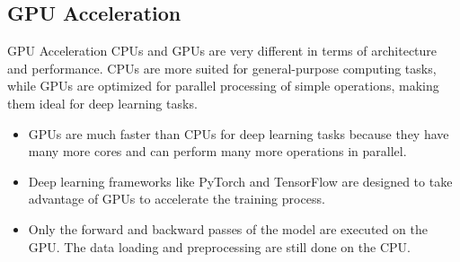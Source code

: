 \subsection{GPU Acceleration}
\begin{frame}{}{GPU Acceleration}
    CPUs and GPUs are very different in terms of architecture and performance. CPUs are more suited for general-purpose computing tasks, while GPUs are optimized for parallel processing of simple operations, making them ideal for deep learning tasks.
    \begin{itemize}
        \item GPUs are much faster than CPUs for deep learning tasks because they have many more cores and can perform many more operations in parallel.
        \item Deep learning frameworks like PyTorch and TensorFlow are designed to take advantage of GPUs to accelerate the training process.
        \item Only the forward and backward passes of the model are executed on the GPU. The data loading and preprocessing are still done on the CPU.
    \end{itemize}
\end{frame}

